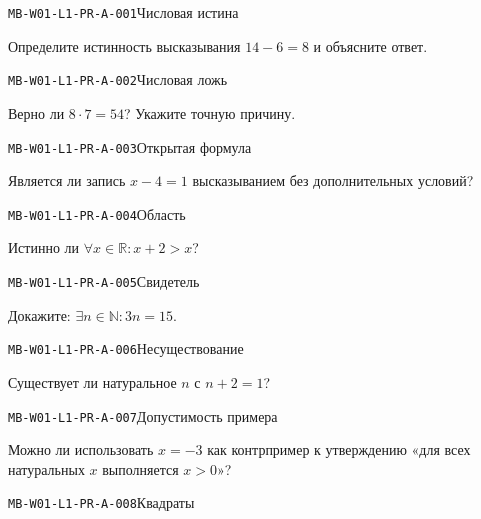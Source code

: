\documentclass[11pt,a4paper,openany]{book}
\newcommand{\muid}[1]{\texttt{\footnotesize #1}}
\begin{document}
\noindent\hypertarget{MB-W01-L1-PR-A-001}{}\muid{MB-W01-L1-PR-A-001}\quad Числовая истина\par

Определите истинность высказывания $14-6=8$ и объясните ответ.\par\medskip

\noindent\hypertarget{MB-W01-L1-PR-A-002}{}\muid{MB-W01-L1-PR-A-002}\quad Числовая ложь\par

Верно ли $8\cdot7=54$? Укажите точную причину.\par\medskip

\noindent\hypertarget{MB-W01-L1-PR-A-003}{}\muid{MB-W01-L1-PR-A-003}\quad Открытая формула\par

Является ли запись $x-4=1$ высказыванием без дополнительных условий?\par\medskip

\noindent\hypertarget{MB-W01-L1-PR-A-004}{}\muid{MB-W01-L1-PR-A-004}\quad Область\par

Истинно ли $\forall x\in\mathbb R\colon x+2>x$?\par\medskip

\noindent\hypertarget{MB-W01-L1-PR-A-005}{}\muid{MB-W01-L1-PR-A-005}\quad Свидетель\par

Докажите: $\exists n\in\mathbb N\colon 3n=15$.\par\medskip

\noindent\hypertarget{MB-W01-L1-PR-A-006}{}\muid{MB-W01-L1-PR-A-006}\quad Несуществование\par

Существует ли натуральное $n$ с $n+2=1$?\par\medskip

\noindent\hypertarget{MB-W01-L1-PR-A-007}{}\muid{MB-W01-L1-PR-A-007}\quad Допустимость примера\par

Можно ли использовать $x=-3$ как контрпример к утверждению «для всех натуральных $x$ выполняется $x>0$»?\par\medskip

\noindent\hypertarget{MB-W01-L1-PR-A-008}{}\muid{MB-W01-L1-PR-A-008}\quad Квадраты\par
\end{document}
